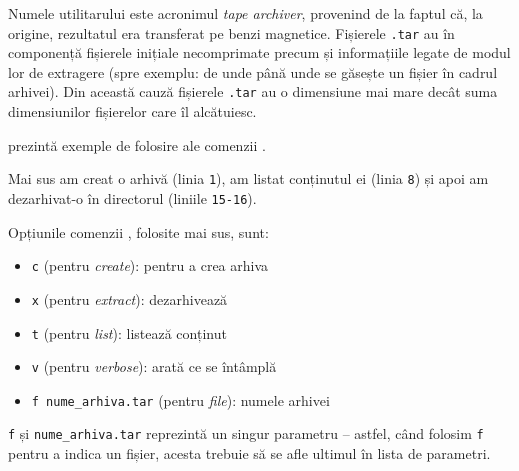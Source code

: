Numele utilitarului  este acronimul \textit{tape archiver}, provenind de la faptul că, la origine, rezultatul era transferat pe benzi magnetice. Fișierele \texttt{.tar} au în componență fișierele inițiale necomprimate precum și informațiile legate de modul lor de extragere (spre exemplu: de unde până unde se găsește un fișier în cadrul arhivei). Din această cauză fișierele \texttt{.tar} au o dimensiune mai mare decât suma dimensiunilor fișierelor care îl alcătuiesc.

 prezintă exemple de folosire ale comenzii .


Mai sus am creat o arhivă  (linia \texttt{1}), am listat conținutul ei (linia \texttt{8}) și apoi am dezarhivat-o în directorul  (liniile \texttt{15-16}).

Opțiunile comenzii , folosite mai sus, sunt:
\begin{itemize}
  \item \texttt{c} (pentru \textit{create}): pentru a crea arhiva
  \item \texttt{x} (pentru \textit{extract}): dezarhivează
  \item \texttt{t} (pentru \textit{list}): listează conținut
  \item \texttt{v} (pentru \textit{verbose}): arată ce se întâmplă
  \item \texttt{f nume\_arhiva.tar} (pentru \textit{file}): numele arhivei
\end{itemize}

\begin{note}[Observație]
\texttt{f} și \texttt{nume\_arhiva.tar} reprezintă un singur parametru – astfel, când folosim \texttt{f} pentru a indica un fișier, acesta trebuie să se afle ultimul în lista de parametri.
\end{note}

